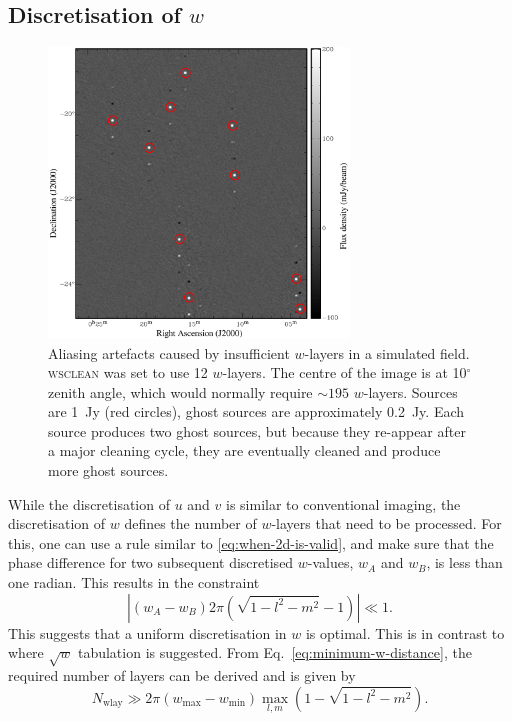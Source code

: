 \documentclass[useAMS,usenatbib]{mn2e}
\newcommand{\degree}{\ensuremath{^{\circ}}\xspace}
\begin{document}
\subsection{Discretisation of $w$} \label{sec:gridding-w}
\begin{figure}
\begin{center}
\includegraphics[width=8cm]{img/aliasing-example-annotated}
\caption{Aliasing artefacts caused by insufficient $w$-layers in a simulated field. \textsc{wsclean} was set to use 12 $w$-layers. The centre of the image is at 10\degree zenith angle, which would normally require $\sim195$ $w$-layers. Sources are 1~Jy (red circles), ghost sources are approximately 0.2~Jy. Each source produces two ghost sources, but because they re-appear after a major cleaning cycle, they are eventually cleaned and produce more ghost sources. }
\label{fig:aliasing-example}
\end{center}
\end{figure}
While the discretisation of $u$ and $v$ is similar to conventional imaging, the discretisation of $w$ defines the number of $w$-layers that need to be processed. For this, one can use a rule similar to \eqref{eq:when-2d-is-valid}, and make sure that the phase difference for two subsequent discretised $w$-values, $w_A$ and $w_B$,  is less than one radian. This results in the constraint
\begin{equation} \label{eq:minimum-w-distance}
\left|\left(w_A - w_B\right) 2\pi (\sqrt{1-l^2-m^2}-1)\right| \ll 1.
\end{equation}
This suggests that a uniform discretisation in $w$ is optimal. This is in contrast to \citet{wprojection-cornwell} where $\sqrt{w}$ tabulation is suggested. From Eq.~\eqref{eq:minimum-w-distance}, the required number of layers can be derived and is given by
\begin{equation} \label{eq:nwlayers-bound}
 N_\textrm{wlay} \gg 2\pi \left(w_{\max} - w_{\min}\right) \max_{l,m} \left(1 - \sqrt{1-l^2-m^2}\right).
\end{equation}
\end{document}
